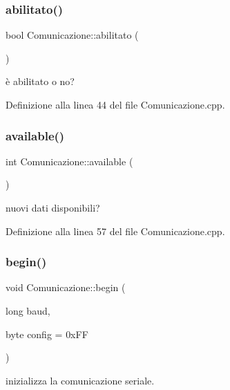 \subsubsection{\texorpdfstring{abilitato()}{abilitato()}}
{\footnotesize\ttfamily bool Comunicazione\+::abilitato (\begin{DoxyParamCaption}{ }\end{DoxyParamCaption})}



è abilitato o no? 



Definizione alla linea 44 del file Comunicazione.\+cpp.

\mbox{\label{class_comunicazione_a78272d5101baaebf7470d6c5bbcd38c2}} 
\subsubsection{\texorpdfstring{available()}{available()}}
{\footnotesize\ttfamily int Comunicazione\+::available (\begin{DoxyParamCaption}{ }\end{DoxyParamCaption})}



nuovi dati disponibili? 



Definizione alla linea 57 del file Comunicazione.\+cpp.

\mbox{\label{class_comunicazione_ab8be3e3473b5cb78466f732475c62658}} 
\subsubsection{\texorpdfstring{begin()}{begin()}\hspace{0.1cm}{\footnotesize\ttfamily [1/2]}}
{\footnotesize\ttfamily void Comunicazione\+::begin (\begin{DoxyParamCaption}\item[{long}]{baud,  }\item[{byte}]{config = {\ttfamily 0xFF} }\end{DoxyParamCaption})}



inizializza la comunicazione seriale. 


